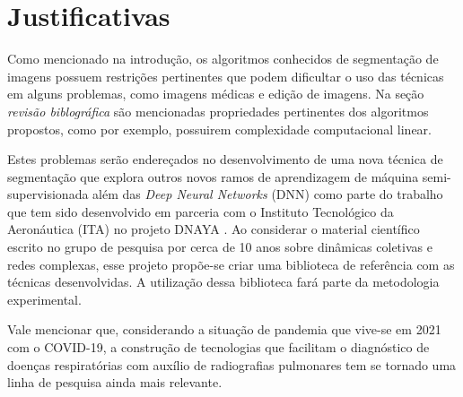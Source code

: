 \chapter{Justificativas}\label{cap:justificativas}

Como mencionado na introdução, os algoritmos conhecidos de segmentação
de imagens possuem restrições pertinentes que podem dificultar o uso
das técnicas em alguns problemas, como imagens médicas e edição de
imagens. Na seção \textit{revisão biblográfica} são mencionadas propriedades
pertinentes dos algoritmos propostos, como por exemplo, possuirem complexidade
computacional linear.

Estes problemas serão endereçados no desenvolvimento de uma nova
técnica de segmentação que explora outros novos ramos de aprendizagem
de máquina semi-supervisionada além das \textit{Deep Neural Networks}
(DNN) como parte do trabalho que tem sido desenvolvido em parceria com
o Instituto Tecnológico da Aeronáutica (ITA) no projeto DNAYA
\cite{DnayaMotivation}. Ao considerar o material científico escrito no
grupo de pesquisa por cerca de 10 anos sobre dinâmicas coletivas e
redes complexas, esse projeto propõe-se criar uma biblioteca de
referência com as técnicas desenvolvidas. A utilização dessa
biblioteca fará parte da metodologia experimental.

Vale mencionar que, considerando a situação de pandemia que vive-se em
2021 com o COVID-19, a construção de tecnologias que facilitam o
diagnóstico de doenças respiratórias com auxílio de radiografias
pulmonares tem se tornado uma linha de pesquisa ainda mais relevante.

